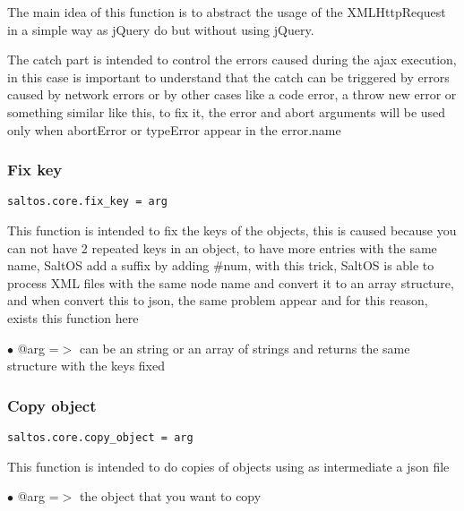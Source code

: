 \documentclass[a4paper]{article}
\begin{document}
The main idea of this function is to abstract the usage of the XMLHttpRequest in a simple
way as jQuery do but without using jQuery.

The catch part is intended to control the errors caused during the ajax execution,
in this case is important to understand that the catch can be triggered by errors
caused by network errors or by other cases like a code error, a throw new error or
something similar like this, to fix it, the error and abort arguments will be used
only when abortError or typeError appear in the error.name

\hypertarget{toc704}{}
\subsubsection{Fix key}

\begin{lstlisting}
saltos.core.fix_key = arg
\end{lstlisting}

This function is intended to fix the keys of the objects, this is caused because you can not
have 2 repeated keys in an object, to have more entries with the same name, SaltOS add a suffix
by adding \#num, with this trick, SaltOS is able to process XML files with the same node name
and convert it to an array structure, and when convert this to json, the same problem appear and
for this reason, exists this function here

\begin{compactitem}
\item[\color{myblue}$\bullet$] @arg =$>$ can be an string or an array of strings and returns the same structure with the keys fixed
\end{compactitem}

\hypertarget{toc705}{}
\subsubsection{Copy object}

\begin{lstlisting}
saltos.core.copy_object = arg
\end{lstlisting}

This function is intended to do copies of objects using as intermediate a json file

\begin{compactitem}
\item[\color{myblue}$\bullet$] @arg =$>$ the object that you want to copy
\end{compactitem}
\end{document}
